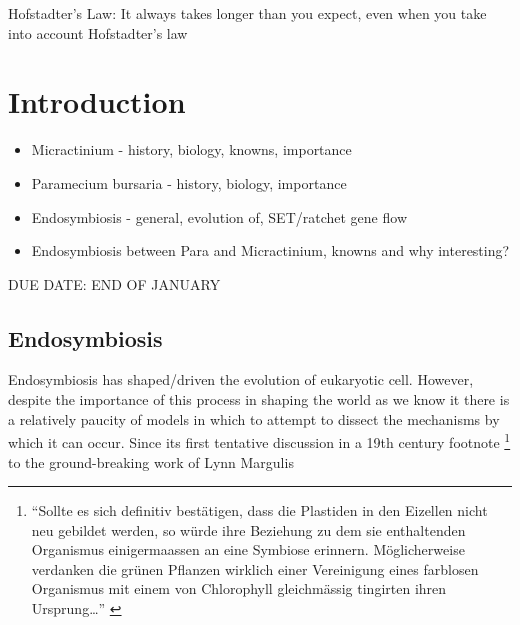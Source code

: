 \graphicspath{{chapters/1.Introduction/figures}}
\begin{savequote}[75mm]
Hofstadter's Law: It always takes longer than you expect, even when you take into account Hofstadter's law
\end{savequote}

\chapter{Introduction}

\begin{itemize}
    \item Micractinium - history, biology, knowns, importance
    \item Paramecium bursaria - history, biology, importance
    \item Endosymbiosis - general, evolution of, SET/ratchet gene flow
    \item Endosymbiosis between Para and Micractinium, knowns and why interesting?
\end{itemize}

DUE DATE: END OF JANUARY

\section{Endosymbiosis}


Endosymbiosis has shaped/driven the evolution of eukaryotic cell.  %
However, despite the importance of this process in shaping the world as we know
it there is a relatively paucity of models in which to attempt to dissect the 
mechanisms by which it can occur. %
Since its first tentative discussion in a 19th century footnote
\footnote{``Sollte es sich definitiv best\"atigen, dass die Plastiden in den 
Eizellen nicht neu gebildet werden, so w\"urde ihre Beziehung zu dem sie 
enthaltenden Organismus einigermaassen an eine Symbiose erinnern. M\"oglicherweise
verdanken die gr\"unen Pflanzen wirklich einer Vereinigung eines farblosen Organismus
mit einem von Chlorophyll gleichm\"assig tingirten ihren Ursprung\ldots'' \citep{Schimper1883}} 
to the ground-breaking work of Lynn Margulis \citep{Sagan1967} 





